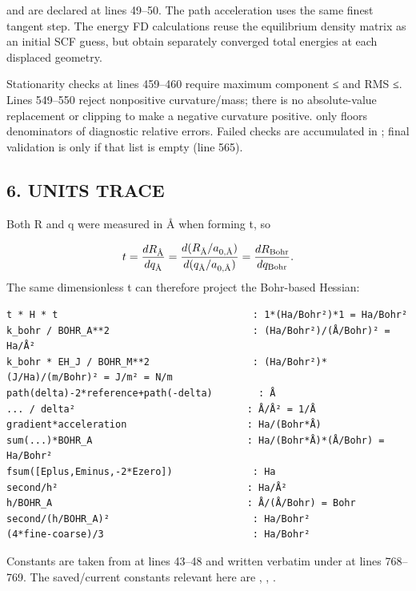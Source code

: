 \documentclass[10pt,a4paper]{article}
\begin{document}
 and  are declared at lines 49–50. The path acceleration uses the same finest tangent step. The energy FD calculations reuse the equilibrium density matrix as an initial SCF guess, but obtain separately converged total energies at each displaced geometry.

Stationarity checks at lines 459–460 require maximum component ≤ and RMS ≤. Lines 549–550 reject nonpositive curvature/mass; there is no absolute-value replacement or clipping to make a negative curvature positive.  only floors denominators of diagnostic relative errors. Failed checks are accumulated in ; final validation is  only if that list is empty (line 565).

\subsection{6. UNITS TRACE}
Both R and q were measured in Å when forming t, so

\[
t=\frac{dR_{\text{\AA}}}{dq_{\text{\AA}}}=
\frac{d(R_{\text{\AA}}/a_{0,\text{\AA}})}{d(q_{\text{\AA}}/a_{0,\text{\AA}})}
=\frac{dR_{\rm Bohr}}{dq_{\rm Bohr}}.
\]
The same dimensionless t can therefore project the Bohr-based Hessian:

\begin{Verbatim}
t * H * t                                  : 1*(Ha/Bohr²)*1 = Ha/Bohr²
k_bohr / BOHR_A**2                         : (Ha/Bohr²)/(Å/Bohr)² = Ha/Å²
k_bohr * EH_J / BOHR_M**2                  : (Ha/Bohr²)*(J/Ha)/(m/Bohr)² = J/m² = N/m
path(delta)-2*reference+path(-delta)        : Å
... / delta²                              : Å/Å² = 1/Å
gradient*acceleration                     : Ha/(Bohr*Å)
sum(...)*BOHR_A                           : Ha/(Bohr*Å)*(Å/Bohr) = Ha/Bohr²
fsum([Eplus,Eminus,-2*Ezero])              : Ha
second/h²                                 : Ha/Å²
h/BOHR_A                                  : Å/(Å/Bohr) = Bohr
second/(h/BOHR_A)²                         : Ha/Bohr²
(4*fine-coarse)/3                          : Ha/Bohr²
\end{Verbatim}
Constants are taken from  at lines 43–48 and written verbatim under  at lines 768–769. The saved/current constants relevant here are , , .
\end{document}
